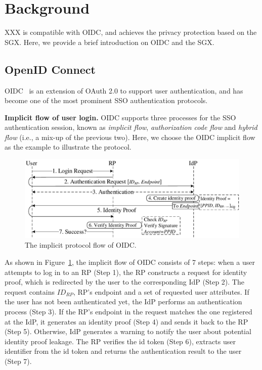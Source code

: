 \section{Background}
\label{sec:background}
XXX is compatible with OIDC, and achieves the privacy protection based on the SGX.
Here, we provide a brief introduction on OIDC and the SGX.
\subsection{OpenID Connect}
OIDC~\cite{OpenIDConnect} is an extension of OAuth 2.0 to support user authentication,
 and has become one of the most prominent SSO authentication protocols.

\noindent\textbf{Implicit flow of user login.}
OIDC supports three processes for the SSO authentication session, known as {\em implicit flow}, {\em authorization code flow} and {\em hybrid flow} (i.e., a mix-up of the previous two). Here, we choose the OIDC implicit flow as the example to illustrate the protocol. 

\begin{figure}[t]
  \centering
  \includegraphics[width=\linewidth]{fig/OIDC1.pdf}
  \caption{The implicit protocol flow of OIDC.}
  \label{fig:OpenID}
\end{figure}

As shown in Figure~\ref{fig:OpenID}, the implicit flow of OIDC consists of 7 steps: when a user attempts to log in to an RP (Step 1), the RP constructs a request for identity proof, which is redirected by the user to the corresponding IdP (Step 2). The request contains $ID_{RP}$, RP's endpoint and a set of requested user attributes. If the user has not been authenticated yet, the IdP performs an authentication process (Step 3). If the RP's endpoint in the request matches the one registered at the IdP, it generates an identity proof (Step 4) and sends it back to the RP (Step 5). Otherwise, IdP generates a warning to notify the user about potential identity proof leakage. The RP verifies the id token (Step 6), extracts user identifier from the id token and returns the authentication result to the user (Step 7).


